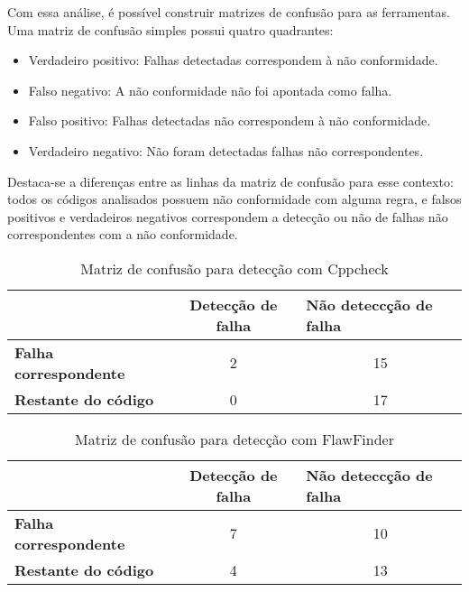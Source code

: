 Com essa análise, é possível construir matrizes de confusão para as ferramentas. Uma matriz de confusão simples possui quatro quadrantes:
\begin{itemize}
  \item Verdadeiro positivo: Falhas detectadas correspondem à não conformidade.
  \item Falso negativo: A não conformidade não foi apontada como falha.
  \item Falso positivo: Falhas detectadas não correspondem à não conformidade.
  \item Verdadeiro negativo: Não foram detectadas falhas não correspondentes.
\end{itemize}

Destaca-se a diferenças entre as linhas da matriz de confusão para esse contexto: todos os códigos analisados possuem não conformidade com alguma regra, e falsos positivos e verdadeiros negativos correspondem a detecção ou não de falhas não correspondentes com a não conformidade.

\begin{table}[ht]
  \begin{tabular}{@{}lcc@{}}
  \toprule
                      & \textbf{Detecção de falha} & \multicolumn{1}{l}{\textbf{Não deteccção de falha}} \\ \midrule
  \textbf{Falha correspondente} & 2                        & 15                                               \\
  \textbf{Restante do código} & 0                        & 17                                               \\ \bottomrule
  \end{tabular}
  \caption{Matriz de confusão para detecção com Cppcheck}
  \label{tab:cppcheck}
  \end{table}

\begin{table}[ht]
\begin{tabular}{@{}lcc@{}}
\toprule
                    & \textbf{Detecção de falha} & \multicolumn{1}{l}{\textbf{Não deteccção de falha}} \\ \midrule
\textbf{Falha correspondente} & 7                        & 10                                               \\
\textbf{Restante do código} & 4                        & 13                                               \\ \bottomrule
\end{tabular}
\caption{Matriz de confusão para detecção com FlawFinder}
\label{tab:flawfinder}
\end{table}

